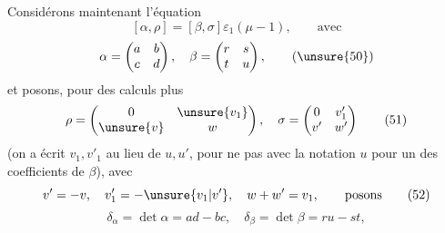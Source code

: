 Considérons maintenant l'équation
\[
[\alpha,\rho]=[\beta,\sigma]\varepsilon_1(\mu-1),\qquad\text{avec} \tag{49}
\]
\[
\alpha=\begin{pmatrix}a&b\\c&d\end{pmatrix},\quad
\beta=\begin{pmatrix}r&s\\t&u\end{pmatrix}, \tag{\unsure{50}}
\]
et posons, pour des calculs plus 
\[
\rho=\begin{pmatrix}0&\unsure{v_1}\\\unsure{v}&w\end{pmatrix},\quad
\sigma=\begin{pmatrix}0&v'_1\\v'&w'\end{pmatrix} \tag{51}
\]
(on a écrit $v_1,v'_1$ au lieu de $u,u'$, pour ne pas  avec la notation $u$ pour un des coefficients de $\beta$), avec
\[
v'=-v,\quad v'_1=-\unsure{v_1|v'},\quad w+w'=v_1,\qquad\text{posons} \tag{52}
\]
\[
\delta_\alpha=\det\alpha=ad-bc,\quad
\delta_\beta=\det\beta=ru-st,
\tag{53}
\]


